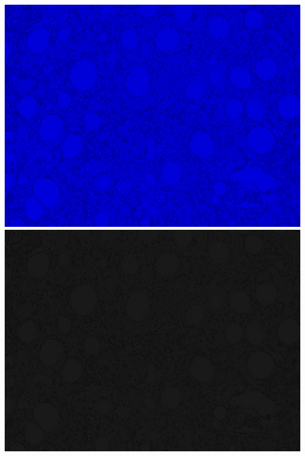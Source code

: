 \documentclass[a4paper]{article}
\begin{document}
\begin{minipage}{0.24\textwidth}
    \centering
    \includegraphics[width=\textwidth]{../code/task1/output/b_channel.jpg}
    \includegraphics[width=\textwidth]{../code/task1/output/b_channel_greyscale.jpg}
\end{minipage}
\hfill
\end{document}

